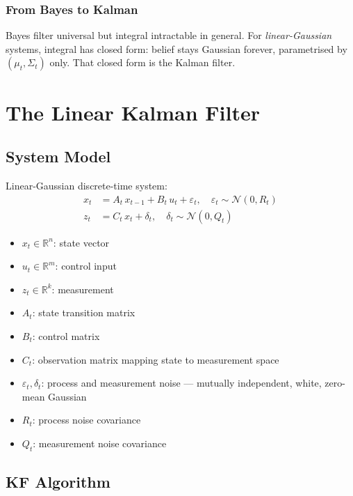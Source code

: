 \documentclass[11pt,a4paper]{article}
\begin{document}
\subsubsection{From Bayes to Kalman}

Bayes filter universal but integral intractable in general. For \emph{linear-Gaussian} systems, integral has closed form: belief stays Gaussian forever, parametrised by $(\mu_t, \Sigma_t)$ only. That closed form is the Kalman filter.

\section{The Linear Kalman Filter}

\subsection{System Model}

Linear-Gaussian discrete-time system:
\begin{align}
x_t &= A_t\, x_{t-1} + B_t\, u_t + \varepsilon_t, \quad \varepsilon_t \sim \mathcal{N}(0, R_t) \\
z_t &= C_t\, x_t + \delta_t, \quad \delta_t \sim \mathcal{N}(0, Q_t)
\end{align}

\begin{itemize}
\item $x_t \in \mathbb{R}^n$: state vector
\item $u_t \in \mathbb{R}^m$: control input
\item $z_t \in \mathbb{R}^k$: measurement
\item $A_t$: state transition matrix
\item $B_t$: control matrix
\item $C_t$: observation matrix mapping state to measurement space
\item $\varepsilon_t, \delta_t$: process and measurement noise --- mutually independent, white, zero-mean Gaussian
\item $R_t$: process noise covariance
\item $Q_t$: measurement noise covariance
\end{itemize}

\subsection{KF Algorithm}
\end{document}
